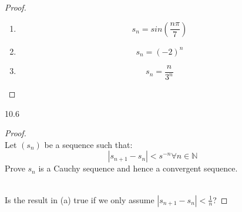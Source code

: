 \documentclass[11pt]{article}
\theoremstyle{definition}  %
\begin{document}
\begin{enumerate}
\begin{proof}
\begin{enumerate}
      \item
      \[
        s_n=sin(\frac{n\pi}{7})
      \]
      \item
      \[
        s_n=(-2)^n
      \]
      \item
      \[
        s_n=\frac{n}{3^n}
      \]
    \end{enumerate}
  \end{proof}
  \item 10.6
  \begin{proof}
    \item\\
    Let $(s_n)$ be a sequence such that:
    \[
      |s_{n+1}-s_n|<s^{-n} \forall n\in \mathbb{N}
    \]
    Prove $s_n$ is a Cauchy sequence and hence a convergent sequence.
    \item\\
    Is the result in (a) true if we only assume $|s_{n+1}-s_n|<\frac{1}{n}$?
  \end{proof}
\end{enumerate}
\end{document}
